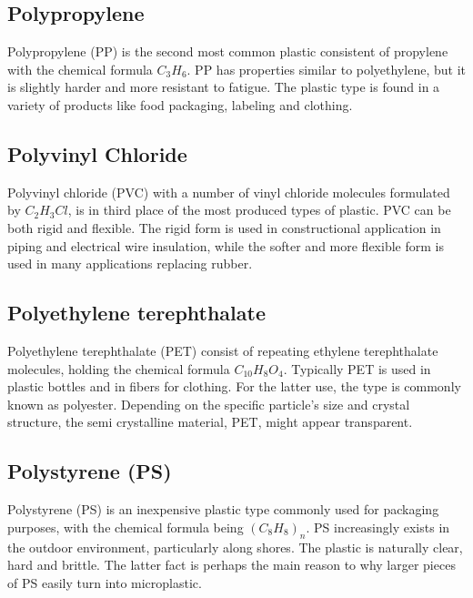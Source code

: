 \subsection{Polypropylene}
Polypropylene (PP) is the second most common plastic consistent of propylene with the chemical formula $C_3H_6$. PP has properties similar to polyethylene, but it is slightly harder and more resistant to fatigue. The plastic type is found in a variety of products like food packaging, labeling and clothing. 

\subsection{Polyvinyl Chloride}
Polyvinyl chloride (PVC) with a number of vinyl chloride molecules formulated by $C_2H_3Cl$, is in third place of the most produced types of plastic. PVC can be both rigid and flexible. The rigid form is used in constructional application in piping and electrical wire insulation, while the softer and more flexible form is used in many applications replacing rubber. 

\subsection{Polyethylene terephthalate}
Polyethylene terephthalate (PET) consist of repeating ethylene terephthalate molecules, holding the chemical formula $C_{10}H_8O_4$. Typically PET is used in plastic bottles and in fibers for clothing. For the latter use, the type is commonly known as polyester. Depending on the specific particle's size and crystal structure, the semi crystalline material, PET, might appear transparent. 

\subsection{Polystyrene (PS)}
Polystyrene (PS) is an inexpensive plastic type commonly used for packaging purposes, with the chemical formula being $(C_8H_8)_n$. PS increasingly exists in the outdoor environment, particularly along shores. The plastic is naturally clear, hard and brittle. The latter fact is perhaps the main reason to why larger pieces of PS easily turn into microplastic. 



